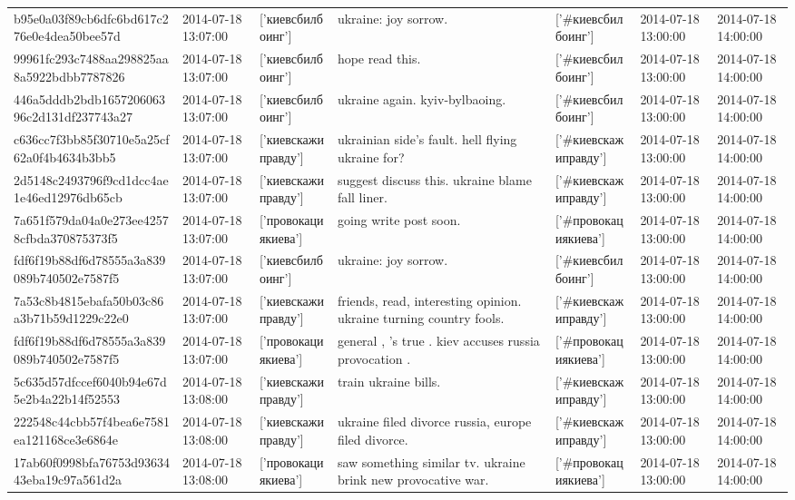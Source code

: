 \begin{tabular}{lllllll}
b95e0a03f89cb6dfc6bd617c276e0e4dea50bee57d & 2014-07-18 13:07:00 & ['киевсбилбоинг'] & ukraine: joy sorrow. & ['#киевсбилбоинг'] & 2014-07-18 13:00:00 & 2014-07-18 14:00:00 \\
99961fc293c7488aa298825aa8a5922bdbb7787826 & 2014-07-18 13:07:00 & ['киевсбилбоинг'] & hope read this. & ['#киевсбилбоинг'] & 2014-07-18 13:00:00 & 2014-07-18 14:00:00 \\
446a5dddb2bdb165720606396c2d131df237743a27 & 2014-07-18 13:07:00 & ['киевсбилбоинг'] & ukraine again. kyiv-bylbaoing. & ['#киевсбилбоинг'] & 2014-07-18 13:00:00 & 2014-07-18 14:00:00 \\
c636cc7f3bb85f30710e5a25cf62a0f4b4634b3bb5 & 2014-07-18 13:07:00 & ['киевскажиправду'] & ukrainian side's fault. hell flying ukraine for? & ['#киевскажиправду'] & 2014-07-18 13:00:00 & 2014-07-18 14:00:00 \\
2d5148c2493796f9cd1dcc4ae1e46ed12976db65cb & 2014-07-18 13:07:00 & ['киевскажиправду'] & suggest discuss this. ukraine blame fall liner. & ['#киевскажиправду'] & 2014-07-18 13:00:00 & 2014-07-18 14:00:00 \\
7a651f579da04a0e273ee42578cfbda370875373f5 & 2014-07-18 13:07:00 & ['провокациякиева'] & going write post soon. & ['#провокациякиева'] & 2014-07-18 13:00:00 & 2014-07-18 14:00:00 \\
fdf6f19b88df6d78555a3a839089b740502e7587f5 & 2014-07-18 13:07:00 & ['киевсбилбоинг'] & ukraine: joy sorrow. & ['#киевсбилбоинг'] & 2014-07-18 13:00:00 & 2014-07-18 14:00:00 \\
7a53c8b4815ebafa50b03c86a3b71b59d1229c22e0 & 2014-07-18 13:07:00 & ['киевскажиправду'] & friends, read, interesting opinion. ukraine turning country fools. & ['#киевскажиправду'] & 2014-07-18 13:00:00 & 2014-07-18 14:00:00 \\
fdf6f19b88df6d78555a3a839089b740502e7587f5 & 2014-07-18 13:07:00 & ['провокациякиева'] & general , 's true . kiev accuses russia provocation . & ['#провокациякиева'] & 2014-07-18 13:00:00 & 2014-07-18 14:00:00 \\
5c635d57dfccef6040b94e67d5e2b4a22b14f52553 & 2014-07-18 13:08:00 & ['киевскажиправду'] & train ukraine bills. & ['#киевскажиправду'] & 2014-07-18 13:00:00 & 2014-07-18 14:00:00 \\
222548c44cbb57f4bea6e7581ea121168ce3e6864e & 2014-07-18 13:08:00 & ['киевскажиправду'] & ukraine filed divorce russia, europe filed divorce. & ['#киевскажиправду'] & 2014-07-18 13:00:00 & 2014-07-18 14:00:00 \\
17ab60f0998bfa76753d9363443eba19c97a561d2a & 2014-07-18 13:08:00 & ['провокациякиева'] & saw something similar tv. ukraine brink new provocative war. & ['#провокациякиева'] & 2014-07-18 13:00:00 & 2014-07-18 14:00:00 \\

\end{tabular}
